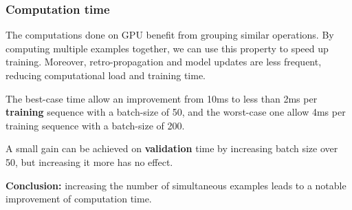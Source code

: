 \subsubsection{Computation time}

The computations done on GPU benefit from grouping similar operations.
By computing multiple examples together, we can use this property to
speed up training. Moreover, retro-propagation and model updates are
less frequent, reducing computational load and training time.

The best-case time allow an improvement from 10ms to less than 2ms per
\textbf{training} sequence with a batch-size of 50, and the worst-case
one allow 4ms per training sequence with a batch-size of 200.

A small gain can be achieved on \textbf{validation} time by increasing
batch size over 50, but increasing it more has no effect.

\textbf{Conclusion:} increasing the number of simultaneous examples
leads to a notable improvement of computation time.

